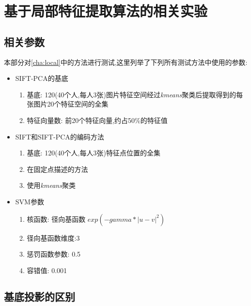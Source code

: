 \section{基于局部特征提取算法的相关实验}
\label{sec:comp_local}

\subsection{相关参数}
本部分对\ref{cha:local}中的方法进行测试,这里列举了下列所有测试方法中使用的参数:

\begin{itemize}
	\item SIFT-PCA的基底 \begin{enumerate}
	\item 基底: 120(40个人,每人3张)图片特征空间经过\textit{kmeans}聚类后提取得到的每张图片20个特征空间的全集
	\item 特征向量数: 前20个特征向量,约占50\%的特征值
	\end{enumerate}
	\item SIFT和SIFT-PCA的编码方法 \begin{enumerate}
\item 基底: 120(40个人,每人3张)特征点位置的全集
	\item 在固定点描述的方法
	\item 使用\textit{kmeans}聚类	\end{enumerate}
	\item SVM参数 \begin{enumerate}
	\item 核函数: 径向基函数 $exp(-gamma*|u-v|^2)$
		\item 径向基函数维度:3
		\item 惩罚函数参数: 0.5
		\item 容错值: 0.001	\end{enumerate}
	
\end{itemize}




\subsection{基底投影的区别}

